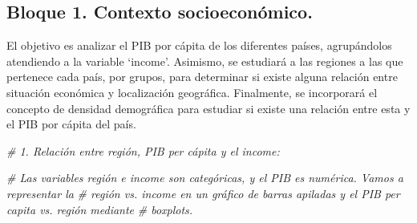 \documentclass[,article,,moreauthors,pdftex]{Definitions/mdpi}
\newenvironment{Shaded}{\begin{snugshade}}{\end{snugshade}}
\newcommand{\CommentTok}[1]{\textcolor[rgb]{0.56,0.35,0.01}{\textit{#1}}}
\begin{document}
\subsection{Bloque 1. Contexto
socioeconómico.}\label{bloque-1.-contexto-socioeconuxf3mico.}

El objetivo es analizar el PIB por cápita de los diferentes países,
agrupándolos atendiendo a la variable `income'. Asimismo, se estudiará a
las regiones a las que pertenece cada país, por grupos, para determinar
si existe alguna relación entre situación económica y localización
geográfica. Finalmente, se incorporará el concepto de densidad
demográfica para estudiar si existe una relación entre esta y el PIB por
cápita del país.

\begin{Shaded}
\begin{Highlighting}[]
\CommentTok{\# 1. Relación entre región, PIB per cápita y el \textquotesingle{}income\textquotesingle{}:}

\CommentTok{\# Las variables región e income son categóricas, y el PIB es numérica. Vamos a representar la }
\CommentTok{\# región vs. income en un gráfico de barras apiladas y el PIB per capita vs. región mediante}
\CommentTok{\# boxplots. }


\end{Highlighting}
\end{Shaded}
\end{document}
